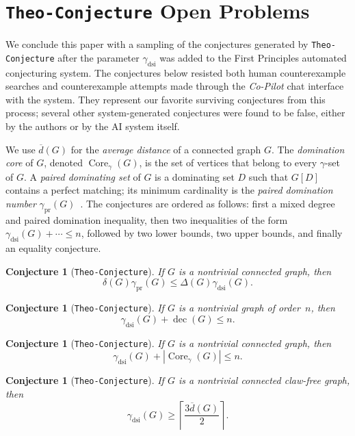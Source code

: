\documentclass[11pt]{article}
\newtheorem{conjecture}[theorem]{Conjecture}
\theoremstyle{definition}
\theoremstyle{remark}
\newcommand{\dsi}{\mathrm{dsi}}
\newcommand{\dec}{\operatorname{dec}}
\newcommand{\Core}{\operatorname{Core}_{\gamma}}
\newcommand{\pr}{\mathrm{pr}}
\newcommand{\avgdist}{\overline{d}}
\DeclareRobustCommand{\TheoConjecture}{\texttt{Theo-Conjecture}}
\DeclareRobustCommand{\CoPilot}{\emph{Co-Pilot}}
\begin{document}
\section{\TheoConjecture{} Open Problems}

We conclude this paper with a sampling of the conjectures generated by
\TheoConjecture{} after the parameter \(\gamma_{\dsi}\) was added to the
First Principles automated conjecturing system. The conjectures below
resisted both human counterexample searches and counterexample attempts made
through the \CoPilot{} chat interface with the system. They represent
our favorite surviving conjectures from this process; several other
system-generated conjectures were found to be false, either by the authors
or by the AI system itself.

We use \(\avgdist(G)\) for the \emph{average distance} of a connected graph
\(G\). The \emph{domination
core} of \(G\), denoted
\(\Core(G)\), is the set of vertices that belong to every \(\gamma\)-set of
\(G\). A \emph{paired dominating set} of \(G\) is a dominating set \(D\) such
that \(G[D]\) contains a perfect matching; its minimum cardinality is the
\emph{paired domination number} \(\gamma_{\pr}(G)\)~\cite{HaynesSlater98}.
The conjectures are ordered as follows: first a mixed degree and paired
domination inequality, then two inequalities of the form
\(\gamma_{\dsi}(G)+\cdots\le n\), followed by two lower bounds, two upper
bounds, and finally an equality conjecture.

\begin{conjecture}[\TheoConjecture]
\label{conj:paired-degree}
If \(G\) is a nontrivial connected graph, then
\[
   \delta(G)\gamma_{\pr}(G)\le \Delta(G)\gamma_{\dsi}(G).
\]
\end{conjecture}

\begin{conjecture}[\TheoConjecture]
\label{conj:decycling-upper}
If \(G\) is a nontrivial graph of order~\(n\), then
\[
   \gamma_{\dsi}(G)+\dec(G)\le n.
\]
\end{conjecture}

\begin{conjecture}[\TheoConjecture]
\label{conj:core}
If \(G\) is a nontrivial connected graph, then
\[
   \gamma_{\dsi}(G)+|\Core(G)|\le n.
\]
\end{conjecture}

\begin{conjecture}[\TheoConjecture]
\label{conj:clawfree-average-distance}
If \(G\) is a nontrivial connected  claw-free graph, then
\[
   \gamma_{\dsi}(G)\ge
   \left\lceil \frac{3\avgdist(G)}{2}\right\rceil.
\]
\end{conjecture}
\end{document}
